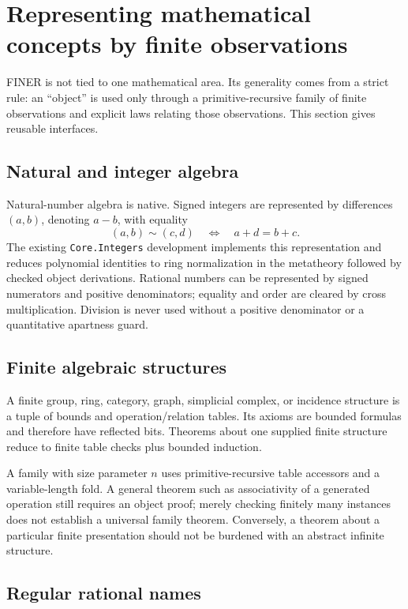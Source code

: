 \section{Representing mathematical concepts by finite observations}
\label{sec:representations}

FINER is not tied to one mathematical area.  Its generality comes from a strict rule: an ``object'' is used only through a primitive-recursive family of finite observations and explicit laws relating those observations.  This section gives reusable interfaces.

\subsection{Natural and integer algebra}

Natural-number algebra is native.  Signed integers are represented by differences \((a,b)\), denoting \(a-b\), with equality
\[
  (a,b)\sim(c,d)\quad\Longleftrightarrow\quad a+d=b+c.
\]
The existing \texttt{Core.Integers} development implements this representation and reduces polynomial identities to ring normalization in the metatheory followed by checked object derivations.  Rational numbers can be represented by signed numerators and positive denominators; equality and order are cleared by cross multiplication.  Division is never used without a positive denominator or a quantitative apartness guard.

\subsection{Finite algebraic structures}

A finite group, ring, category, graph, simplicial complex, or incidence structure is a tuple of bounds and operation/relation tables.  Its axioms are bounded formulas and therefore have reflected bits.  Theorems about one supplied finite structure reduce to finite table checks plus bounded induction.

A family with size parameter \(n\) uses primitive-recursive table accessors and a variable-length fold.  A general theorem such as associativity of a generated operation still requires an object proof; merely checking finitely many instances does not establish a universal family theorem.  Conversely, a theorem about a particular finite presentation should not be burdened with an abstract infinite structure.

\subsection{Regular rational names}

